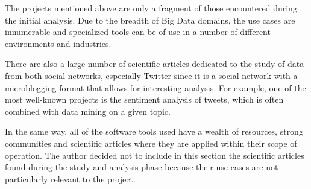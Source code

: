 \nonzeroparskip The projects mentioned above are only a fragment of those encountered during the initial analysis. Due to the breadth of Big Data domains, the use cases are innumerable and specialized tools can be of use in a number of different environments and industries.

\nonzeroparskip There are also a large number of scientific articles dedicated to the study of data from both social networks, especially Twitter since it is a social network with a microblogging format that allows for interesting analysis. For example, one of the most well-known projects is the sentiment analysis of tweets, which is often combined with data mining on a given topic.

\nonzeroparskip In the same way, all of the software tools used have a wealth of resources, strong communities and scientific articles where they are applied within their scope of operation. The author decided not to include in this section the scientific articles found during the study and analysis phase because their use cases are not particularly relevant to the project.